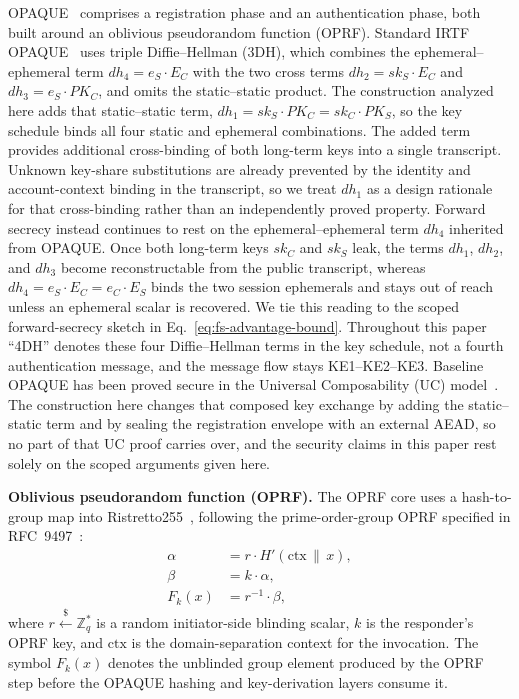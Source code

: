 \documentclass[preprint,12pt]{elsarticle}
\theoremstyle{remark}
\begin{document}
OPAQUE~\cite{jarecki2018} comprises a registration phase and an
authentication phase, both built around an oblivious pseudorandom
function (OPRF). Standard IRTF OPAQUE~\cite{ietf-opaque} uses triple Diffie--Hellman
(3DH), which combines the ephemeral--ephemeral term $dh_4 = e_S \cdot E_C$
with the two cross terms $dh_2 = sk_S \cdot E_C$ and
$dh_3 = e_S \cdot PK_C$, and omits the static--static product.
The construction analyzed here adds that static--static term,
$dh_1 = sk_S \cdot PK_C = sk_C \cdot PK_S$, so the key schedule binds all
four static and ephemeral combinations. The added term provides additional cross-binding of both long-term keys into a
single transcript. Unknown key-share substitutions are already prevented by the
identity and account-context binding in the transcript, so we treat $dh_1$ as a
design rationale for that cross-binding rather than an independently proved
property. Forward secrecy instead continues to rest on the
ephemeral--ephemeral term $dh_4$ inherited from OPAQUE. Once both long-term
keys $sk_C$ and $sk_S$ leak, the terms $dh_1$, $dh_2$, and $dh_3$ become
reconstructable from the public transcript, whereas
$dh_4 = e_S \cdot E_C = e_C \cdot E_S$ binds the two session ephemerals and
stays out of reach unless an ephemeral scalar is recovered. We tie this
reading to the scoped forward-secrecy sketch in
Eq.~\eqref{eq:fs-advantage-bound}. Throughout this paper
``4DH'' denotes these four Diffie--Hellman terms in the key schedule,
not a fourth authentication message, and the message flow stays
KE1--KE2--KE3.
Baseline OPAQUE has been proved secure in the Universal Composability
(UC) model~\cite{jarecki2018,canetti2001}. The construction here changes that
composed key exchange by adding the static--static term and by sealing the
registration envelope with an external AEAD, so no part of that UC proof carries
over, and the security claims in this paper rest solely on the scoped arguments
given here.

\textbf{Oblivious pseudorandom function (OPRF).} The OPRF core uses a
hash-to-group map into Ristretto255~\cite{devalence2024}, following the
prime-order-group OPRF specified in RFC~9497~\cite{rfc9497}:
\begin{equation}
  \begin{aligned}
    \alpha &= r \cdot H'(\mathrm{ctx} \,\|\, x),\\
    \beta &= k \cdot \alpha,\\
    F_k(x) &= r^{-1} \cdot \beta,
  \end{aligned}
\end{equation}
where $r \xleftarrow{\$} \mathbb{Z}_q^*$ is a random initiator-side
blinding scalar, $k$ is the responder's OPRF key, and $\mathrm{ctx}$ is
the domain-separation context for the invocation. The symbol $F_k(x)$ denotes
the unblinded group element produced by the OPRF step before the OPAQUE
hashing and key-derivation layers consume it.
\end{document}
